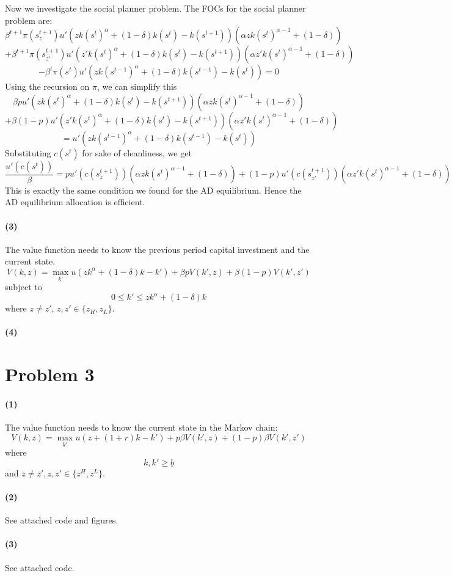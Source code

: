 \documentclass[10pt,letter]{article}
\newcommand{\problem}[1]{\section*{Problem #1}}
\newcommand{\problempart}[1]{\paragraph{#1}}
\begin{document}
Now we investigate the social planner problem. The FOCs for the social planner problem are:
\[ \beta^{t+1}\pi(s^{t+1}_{z})u'(z k(s^{t})^\alpha + (1-\delta)k(s^{t}) - k(s^{t+1}))(\alpha z k(s^t)^{\alpha - 1} + (1-\delta)) \] \[ + \beta^{t+1}\pi(s^{t+1}_{z'})u'(z' k(s^{t})^\alpha + (1-\delta)k(s^{t}) - k(s^{t+1}))(\alpha z' k(s^t)^{\alpha - 1} + (1-\delta)) \] \[  - \beta^t \pi(s^t) u'(z k(s^{t-1})^\alpha + (1-\delta)k(s^{t-1}) - k(s^t)) = 0 \]
Using the recursion on $\pi$, we can simplify this
\[ \beta pu'(z k(s^{t})^\alpha + (1-\delta)k(s^{t}) - k(s^{t+1}))(\alpha z k(s^t)^{\alpha - 1} + (1-\delta))   \]
\[ + \beta (1-p) u'(z' k(s^{t})^\alpha + (1-\delta)k(s^{t}) - k(s^{t+1}))(\alpha z' k(s^t)^{\alpha - 1} + (1-\delta)) \]
\[ =  u'(z k(s^{t-1})^\alpha + (1-\delta)k(s^{t-1}) - k(s^t)) \]
Substituting $c(s^t)$ for sake of cleanliness, we get
\[ \frac{u'(c(s^t))}{\beta} = pu'(c(s^{t+1}_z))(\alpha z k(s^t)^{\alpha - 1} + (1-\delta)) + (1-p)u'(c(s^{t+1}_{z'}))(\alpha z' k(s^t)^{\alpha - 1} + (1-\delta)) \]
This is exactly the same condition we found for the AD equilibrium. Hence the AD equilibrium allocation is efficient.
\problempart{(3)}
The value function needs to know the previous period capital investment and the current state.
\[ V(k, z) = \max_{k'} u(zk^{\alpha} + (1-\delta)k - k') + \beta p V(k', z) + \beta(1-p) V(k', z') \]
subject to
\[ 0 \le k' \le zk^{\alpha} + (1-\delta)k \]
where $z \neq z'$, $z, z' \in \{ z_H, z_L\}$.
\problempart{(4)}
\pagebreak
\problem{3}

\problempart{(1)}
The value function needs to know the current state in the Markov chain:
\[ V(k, z) = \max_{k'} u(z + (1+r)k - k') + p \beta V(k', z) + (1-p) \beta V(k', z') \]
where
\[ k, k' \ge \underline{b} \]
and $z \neq z', z, z' \in \{ z^H, z^L \}$.
\problempart{(2)}
See attached code and figures.
\problempart{(3)}
See attached code.
\end{document}
